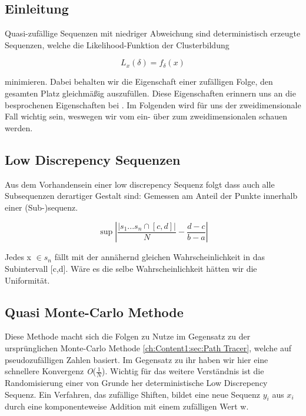 \subsection{Einleitung}

Quasi-zufällige Sequenzen mit niedriger Abweichung sind deterministisch 
erzeugte Sequenzen, welche die Likelihood-Funktion der Clusterbildung

\begin{equation}\label{eq:Likeli-Hood-Gleichung}
    L_{x}(\delta) = f_{\delta}(x)
\end{equation}

minimieren. Dabei behalten wir die Eigenschaft einer zufälligen Folge, 
den gesamten Platz gleichmäßig auszufüllen. Diese Eigenschaften erinnern
uns an die besprochenen Eigenschaften bei .
Im Folgenden wird für uns der zweidimensionale Fall wichtig sein, weswegen
wir vom ein- über zum zweidimensionalen schauen werden.

\subsection{Low Discrepency Sequenzen}
Aus dem Vorhandensein einer low discrepency Sequenz folgt dass auch alle 
Subsequenzen derartiger Gestalt sind: Gemessen am Anteil der Punkte innerhalb
einer (Sub-)sequenz.

\begin{equation}\label{eq:Low Discrepency}
    \sup{\left| \frac{\left| s_{1}...s_{n} \cap [c,d]\right|}{N} - \frac{d-c}{b-a} \right|}
\end{equation}

Jedes x $\in s_{n}$ fällt mit der annähernd gleichen Wahrscheinlichkeit
in das Subintervall [c,d]. Wäre es die selbe Wahrscheinlichkeit hätten 
wir die Uniformität.

\label{sec:quasi monte carlo}
\subsection{Quasi Monte-Carlo Methode}
Diese Methode macht sich die  Folgen zu Nutze
im Gegensatz zu der ursprünglichen Monte-Carlo Methode \ref{ch:Content1:sec:Path Tracer},
welche auf pseudozufälligen Zahlen basiert. Im Gegensatz zu ihr haben wir 
hier eine schnellere Konvergenz \textit{O}($\frac{1}{N}$).
Wichtig für das weitere Verständnis ist die Randomisierung einer von Grunde
her deterministische Low Discrepency Sequenz. Ein Verfahren, das 
zufällige Shiften, bildet eine neue Sequenz $y_{i}$ aus $x_{i}$ durch 
eine komponenteweise Addition mit einem zufälligen Wert w.

